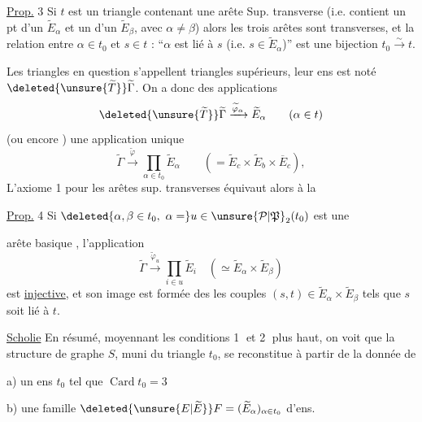 \uline{Prop.} 3 \quad Si $t$ est un triangle contenant une arête Sup. transverse (i.e. contient un pt d'un $\widetilde E_\alpha$ et un d'un $\widetilde E_\beta$, avec  $\alpha\ne\beta$) alors les trois arêtes sont transverses, et la relation entre $\alpha\in t_0$ et $s\in t$ : ``$\alpha$ est lié à $s$ (i.e. $s\in\widetilde E_\alpha$)'' est une bijection $t_0\xrightarrow{\sim}t$.

Les triangles en question s'appellent triangles supérieurs, leur  ens est noté $\deleted{\unsure{\widetilde T}}\widetilde\Gamma$. On a donc des applications
\[
\deleted{\unsure{\widetilde T}}\widetilde\Gamma\xrightarrow{\widetilde\varphi_\alpha}\widetilde E_\alpha\qquad(\alpha\in t)
\]
(ou encore
)  une application unique
\[
\widetilde\Gamma\xrightarrow{\widetilde\varphi}\prod_{\alpha\in t_0}\widetilde E_\alpha
\qquad(=\widetilde E_c\times\widetilde E_b\times\overline E_c),
\]
L'axiome 1 pour les arêtes sup. transverses équivaut alors à la

\uline{Prop.} 4 \quad Si $\deleted{\alpha,\beta\in t_0,\ \alpha=}u\in\unsure{\mathcal P|\mathfrak P}_2(t_0)$ est une

arête basique , l'application
\[
\widetilde\Gamma\xrightarrow{\widetilde\varphi_u}\prod_{i\in u}\widetilde E_i
\quad(\simeq\widetilde E_\alpha\times\widetilde E_\beta)
\]
est \uline{injective}, et son image est formée des  les  couples $(s,t)\in\widetilde E_\alpha\times\widetilde E_\beta$ tels que $s$ soit lié à $t$.

\uline{Scholie} En résumé, moyennant les conditions \textcircled{1} et \textcircled{2} plus haut, on voit que la structure de graphe $S$, muni du triangle $t_0$, se reconstitue à partir de la donnée de

a) un ens $t_0$ tel que $\operatorname{Card}t_0=3$

b) une famille $\deleted{\unsure{E|\widetilde E}}F=(\widetilde E_\alpha)_{\alpha\in t_0}$ d'ens. 

